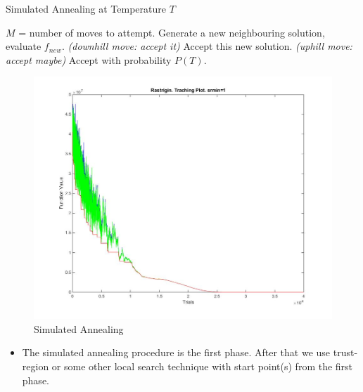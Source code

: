 \documentclass[hyperref={pdfpagelabels=false}]{beamer}
\begin{document}

\begin{frame}
\begin{algorithm} [H]
\caption{Simulated Annealing at Temperature $T$}
\begin{algorithmic} 
\STATE $M$ = number of moves to attempt.
\STATE  Generate a new neighbouring solution, evaluate $f_{new}$.
\STATE \emph{(downhill move: accept it)}
\STATE Accept this new solution. 
\ELSE 
\STATE  \emph{(uphill move: accept maybe)}
\STATE Accept with probability $P(T)$. 
\ENDIF
\ENDFOR
\end{algorithmic}
\end{algorithm}
\end{frame}


\begin{frame}
\begin{figure}
\includegraphics[scale=0.25]{srmin1.jpg}
\caption{Simulated Annealing}
\end{figure}
\end{frame}


\begin{frame}
\begin{itemize}
\item The simulated annealing procedure is the first phase. After that we use trust-region or some other local search technique with start point(s) from the first phase.  
\end{itemize}
\end{frame}
\end{document}
